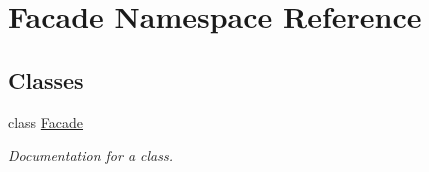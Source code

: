 \hypertarget{namespace_facade}{}\section{Facade Namespace Reference}
\label{namespace_facade}
\subsection*{Classes}
\begin{DoxyCompactItemize}
\item 
class \mbox{\hyperlink{class_facade_1_1_facade}{Facade}}
\begin{DoxyCompactList}\small\item\em Documentation for a class. \end{DoxyCompactList}\end{DoxyCompactItemize}
